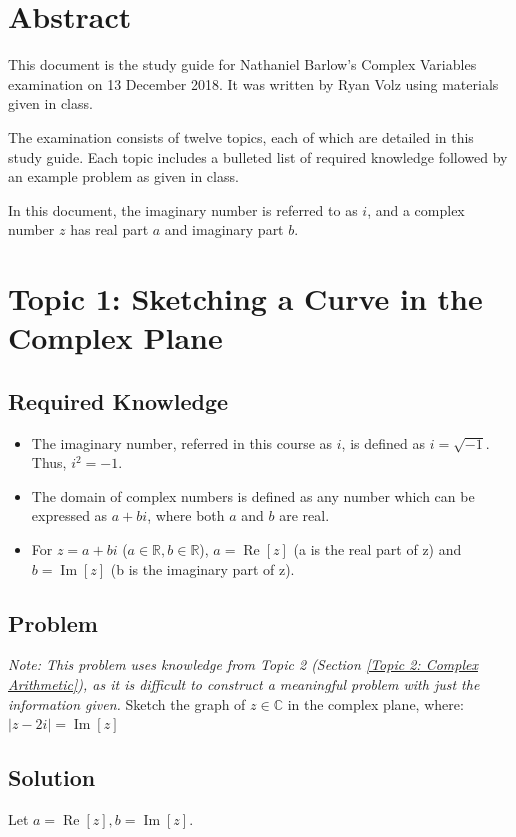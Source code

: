 \documentclass[12pt]{article}
\newcommand{\real}{\mathbb{R}}
\newcommand{\complex}{\mathbb{C}}
\renewcommand{\Re}{\operatorname{Re}}
\renewcommand{\Im}{\operatorname{Im}}
\begin{document}
\normalsize
\section {Abstract}
This document is the study guide for Nathaniel Barlow's Complex Variables examination on 13 December 2018.  It was written by Ryan Volz using materials given in class.

The examination consists of twelve topics, each of which are detailed in this study guide.  Each topic includes a bulleted list of required knowledge followed by an example problem as given in class.

In this document, the imaginary number is referred to as $i$, and a complex number $z$ has real part $a$ and imaginary part $b$.

\section{Topic 1: Sketching a Curve in the Complex Plane}
\subsection{Required Knowledge}
\begin{itemize}
    \item The imaginary number, referred in this course as $i$, is defined as $i=\sqrt{-1}$.  Thus, $i^2=-1$.
    \item The domain of complex numbers is defined as any number which can be expressed as $a+bi$, where both $a$ and $b$ are real.
    \item For $z=a+bi$ ($a\in\real, b\in\real$), $a=\Re[z]$ (a is the real part of z) and $b=\Im[z]$ (b is the imaginary part of z).
\end{itemize}
\subsection{Problem}
\textit{Note: This problem uses knowledge from Topic 2 (Section \ref{Topic 2: Complex Arithmetic}), as it is difficult to construct a meaningful problem with just the information given.}
Sketch the graph of $z\in\complex$ in the complex plane, where:
$|z-2i|=\Im[z]$
\subsection{Solution}
Let $a=\Re[z], b=\Im[z]$.
\end{document}
